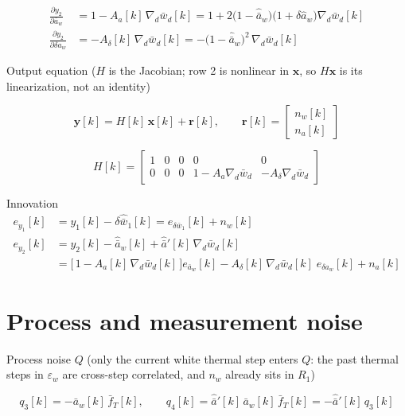 \documentclass[11pt,a4paper,fontset=none]{ctexart}
\begin{document}
\begin{align*}
\frac{\partial y_2}{\partial\bar{a}_w}
  &= 1 - A_a[k]\,\nabla_d\bar{w}_d[k]
   = 1 + 2\bigl(1-\hat{\bar{a}}_w\bigr)\bigl(1+\delta\hat{a}_w\bigr)
     \nabla_d\bar{w}_d[k] \\
\frac{\partial y_2}{\partial\delta a_w}
  &= -A_{\delta}[k]\,\nabla_d\bar{w}_d[k]
   = -\bigl(1-\hat{\bar{a}}_w\bigr)^{2}\,\nabla_d\bar{w}_d[k]
\end{align*}

Output equation ($H$ is the Jacobian; row 2 is nonlinear in $\mathbf{x}$, so
$H\mathbf{x}$ is its linearization, not an identity)

\begin{equation*}
\mathbf{y}[k] = H[k]\,\mathbf{x}[k] + \mathbf{r}[k],
\qquad
\mathbf{r}[k] = \begin{bmatrix} n_w[k] \\ n_a[k] \end{bmatrix}
\end{equation*}

\begin{equation*}
H[k] =
\begin{bmatrix}
1 & 0 & 0 & 0 & 0 \\
0 & 0 & 0 & 1 - A_a\nabla_d\bar{w}_d & -A_{\delta}\nabla_d\bar{w}_d
\end{bmatrix}
\end{equation*}

Innovation
\begin{align*}
e_{y_1}[k] &= y_1[k] - \delta\hat{\bar{w}}_1[k]
  = e_{\delta\bar{w}_1}[k] + n_w[k] \\
e_{y_2}[k] &= y_2[k] - \hat{\bar{a}}_w[k]
  + \hat{\bar{a}}'[k]\,\nabla_d\bar{w}_d[k] \\
  &= \bigl[\,1 - A_a[k]\,\nabla_d\bar{w}_d[k]\,\bigr] e_{\bar{a}_w}[k]
   - A_{\delta}[k]\,\nabla_d\bar{w}_d[k]\; e_{\delta a_w}[k] + n_a[k]
\end{align*}

\section{Process and measurement noise}

Process noise $Q$ (only the current white thermal step enters $Q$: the past
thermal steps in $\varepsilon_w$ are cross-step correlated, and $n_w$ already
sits in $R_1$)

\begin{equation*}
q_3[k] = -\bar{a}_w[k]\,\bar{f}_T[k],
\qquad
q_4[k] = \hat{\bar{a}}'[k]\,\bar{a}_w[k]\,\bar{f}_T[k]
       = -\hat{\bar{a}}'[k]\,q_3[k]
\end{equation*}
\end{document}
